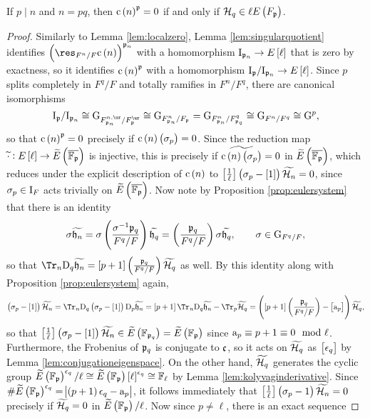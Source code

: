 \begin{lemma}
\label{lem:localiff}
If $ p \mid n $ and $ n = pq $, then $ \c\br{n}^\ppp = 0 $ if and only if $ \HHH_q \in \ell E\br{F_\ppp} $.
\end{lemma}

\begin{proof}
Similarly to Lemma \ref{lem:localzero}, Lemma \ref{lem:singularquotient} identifies $ \br{\res_{F^n / F} \c\br{n}}^{\ppp_n} $ with a homomorphism $ \I_{\ppp_n} \to E\sbr{\ell} $ that is zero by exactness, so it identifies $ \c\br{n}^\ppp $ with a homomorphism $ \I_\ppp / \I_{\ppp_n} \to E\sbr{\ell} $. Since $ p $ splits completely in $ F^q / F $ and totally ramifies in $ F^n / F^q $, there are canonical isomorphisms
$$ \I_\ppp / \I_{\ppp_n} \cong \G_{F_{\ppp_n}^{n, \ur} / F_\ppp^{\ur}} \cong \G_{F_{\ppp_n}^n / F_\ppp} = \G_{F_{\ppp_n}^n / F_{\ppp_q}^q} \cong \G_{F^n / F^q} \cong \G^p, $$
so that $ \c\br{n}^\ppp = 0 $ precisely if $ \c\br{n}\br{\sigma_p} = 0 $. Since the reduction map $ \widetilde{\cdot} : E\sbr{\ell} \to \widetilde{E}\br{\overline{\FF_\ppp}} $ is injective, this is precisely if $ \widetilde{\c\br{n}\br{\sigma_p}} = 0 $ in $ \widetilde{E}\br{\overline{\FF_\ppp}} $, which reduces under the explicit description of $ \c\br{n} $ to $ \sbr{\tfrac{1}{\ell}}\br{\sigma_p - \sbr{1}} \widetilde{\HHH_n} = 0 $, since $ \sigma_p \in \mathrm{I}_F $ acts trivially on $ \widetilde{E}\br{\overline{\FF_\ppp}} $. Now note by Proposition \ref{prop:eulersystem} that there is an identity
$$ \sigma \widetilde{\hhh_n} = \sigma\br{\dfrac{\sigma^{-1}\ppp_q}{F^q / F}} \widetilde{\hhh_q} = \br{\dfrac{\ppp_q}{F^q / F}}\sigma \widetilde{\hhh_q}, \qquad \sigma \in \G_{F^q / F}, $$
so that $ \Tr_n\D_q \widetilde{\hhh_n} = \sbr{p + 1}\br{\tfrac{\ppp_q}{F^q / F}} \widetilde{\HHH_q} $ as well. By this identity along with Proposition \ref{prop:eulersystem} again,
$$ \br{\sigma_p - \sbr{1}} \widetilde{\HHH_n} = \Tr_n\D_q\br{\sigma_p - \sbr{1}}\D_p \widetilde{\hhh_n} = \sbr{p + 1}\Tr_n\D_q \widetilde{\hhh_n} - \Tr_p \widetilde{\HHH_q} = \br{\sbr{p + 1}\br{\dfrac{\ppp_q}{F^q / F}} - \sbr{\a_p}} \widetilde{\HHH_q}, $$
so that $ \sbr{\tfrac{1}{\ell}}\br{\sigma_p - \sbr{1}} \widetilde{\HHH_n} \in \widetilde{E}\br{\FF_{\ppp_q}} = \widetilde{E}\br{\FF_\ppp} $ since $ \mathrm{a}_p \equiv p + 1 \equiv 0 \mod \ell $. Furthermore, the Frobenius of $ \mathfrak{p}_q $ is conjugate to $ \mathfrak{c} $, so it acts on $ \widetilde{\mathcal{H}_q} $ as $ \sbr{\epsilon_q} $ by Lemma \ref{lem:conjugationeigenspace}. On the other hand, $ \widetilde{\mathcal{H}_q} $ generates the cyclic group $ \widetilde{E}\br{\FF_\ppp}^{\epsilon_q} / \ell \cong \widetilde{E}\br{\FF_\ppp}\sbr{\ell}^{\epsilon_q} \cong \FF_\ell $ by Lemma \ref{lem:kolyvaginderivative}. Since $ \#\widetilde{E}\br{\FF_\ppp}^{\epsilon_q} = \abs{\br{p + 1}\epsilon_q - \a_p} $, it follows immediately that $ \sbr{\tfrac{1}{\ell}}\br{\sigma_p - 1} \widetilde{\HHH_n} = 0 $ precisely if $ \widetilde{\mathcal{H}_q} = 0 $ in $ \widetilde{E}\br{\FF_\ppp} / \ell $. Now since $ p \ne \ell $, there is an exact sequence

\end{proof}

